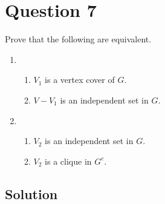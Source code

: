 
\section*{Question 7}

Prove that the following are equivalent.
\begin{enumerate}
  \item
  \begin{enumerate}
    \item $V_1$ is a vertex cover of $G$.
    \item $V - V_1$ is an independent set in $G$.
  \end{enumerate}
  \item
  \begin{enumerate}
    \item $V_2$ is an independent set in $G$.
    \item $V_2$ is a clique in $G^c$.
  \end{enumerate}
\end{enumerate}

\subsection*{Solution}

